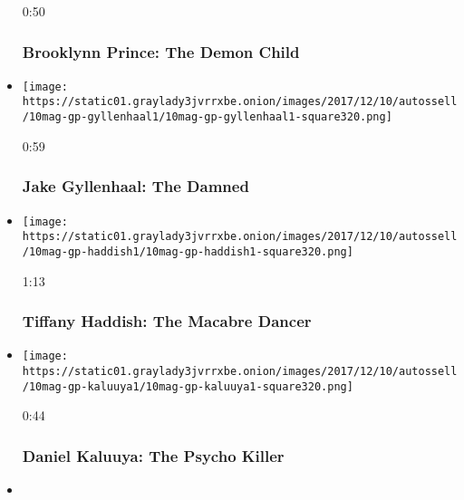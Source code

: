 \begin{itemize}
  0:50

  \hypertarget{brooklynn-prince-the-demon-child}{%
  \subsubsection{Brooklynn Prince: The Demon
  Child}\label{brooklynn-prince-the-demon-child}}
\item
  \href{https://www.nytimes3xbfgragh.onion/video/magazine/100000005588876/jake-gyllenhaal-the-damned.html?action=click\&module=video-series-bar\&region=header\&pgtype=Article\&playlistId=video/magazine}{}

  \texttt{[image: https://static01.graylady3jvrrxbe.onion/images/2017/12/10/autossell/10mag-gp-gyllenhaal1/10mag-gp-gyllenhaal1-square320.png]}

  0:59

  \hypertarget{jake-gyllenhaal-the-damned}{%
  \subsubsection{Jake Gyllenhaal: The
  Damned}\label{jake-gyllenhaal-the-damned}}
\item
  \href{https://www.nytimes3xbfgragh.onion/video/magazine/100000005588881/tiffany-haddish-the-macabre-dancer.html?action=click\&module=video-series-bar\&region=header\&pgtype=Article\&playlistId=video/magazine}{}

  \texttt{[image: https://static01.graylady3jvrrxbe.onion/images/2017/12/10/autossell/10mag-gp-haddish1/10mag-gp-haddish1-square320.png]}

  1:13

  \hypertarget{tiffany-haddish-the-macabre-dancer}{%
  \subsubsection{Tiffany Haddish: The Macabre
  Dancer}\label{tiffany-haddish-the-macabre-dancer}}
\item
  \href{https://www.nytimes3xbfgragh.onion/video/magazine/100000005588890/daniel-kaluuya-the-psycho-killer.html?action=click\&module=video-series-bar\&region=header\&pgtype=Article\&playlistId=video/magazine}{}

  \texttt{[image: https://static01.graylady3jvrrxbe.onion/images/2017/12/10/autossell/10mag-gp-kaluuya1/10mag-gp-kaluuya1-square320.png]}

  0:44

  \hypertarget{daniel-kaluuya-the-psycho-killer}{%
  \subsubsection{Daniel Kaluuya: The Psycho
  Killer}\label{daniel-kaluuya-the-psycho-killer}}
\item
  \href{https://www.nytimes3xbfgragh.onion/video/magazine/100000005555132/the-10-great-performers-of-2017-and-why-we-chose-them.html?action=click\&module=video-series-bar\&region=header\&pgtype=Article\&playlistId=video/magazine}{}


\end{itemize}
